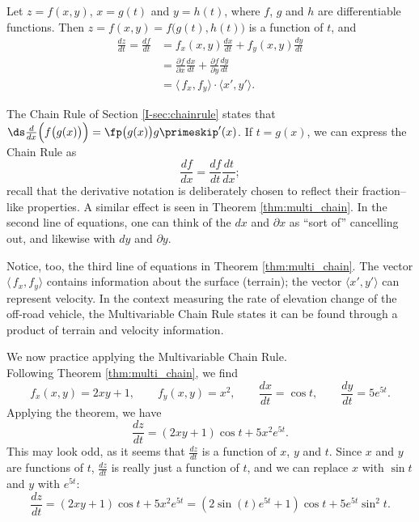 {Let $z=f(x,y)$, $x=g(t)$ and $y=h(t)$, where $f$, $g$ and $h$ are differentiable functions. Then $z = f(x,y) = f\big(g(t),h(t)\big)$ is a function of $t$, and 
\begin{align*}
\frac{dz}{dt} = \frac{df}{dt} &= f_x(x,y)\frac{dx}{dt}+f_y(x,y)\frac{dy}{dt}\\[5pt]
		&= \frac{\partial f}{\partial x}\frac{dx}{dt}+\frac{\partial f}{\partial y}\frac{dy}{dt}\\
		&= \langle\, f_x,f_y\rangle \cdot \langle x',y'\rangle.
\end{align*}
}

The Chain Rule of Section \ref{I-sec:chainrule} states that $\ds \frac{d}{dx}\Big(f\big(g(x)\big)\Big) = \fp\big(g(x)\big)g\primeskip'(x)$. If $t=g(x)$, we can express the Chain Rule as 
\[
\frac{df}{dx} = \frac{df}{dt}\frac{dt}{dx};
\]
recall that the derivative notation is deliberately chosen to reflect their fraction--like properties. A similar effect is seen in Theorem \ref{thm:multi_chain}. In the second line of equations, one can think of the $dx$ and $\partial x$ as ``sort of'' cancelling out, and likewise with $dy$ and $\partial y$. 



Notice, too, the third line of equations in Theorem \ref{thm:multi_chain}. The vector $\langle\,f_x,f_y\rangle$ contains information about the surface (terrain); the vector $\langle x',y'\rangle$ can represent velocity. In the context measuring the rate of elevation change of the off-road vehicle, the Multivariable Chain Rule states it can be found through a product of terrain and velocity information.


We now practice applying the Multivariable Chain Rule.\\

{Following Theorem \ref{thm:multi_chain}, we find
\[
f_x(x,y) = 2xy+1,\qquad f_y(x,y) = x^2,\qquad \frac{dx}{dt} = \cos t,\qquad \frac{dy}{dt}= 5e^{5t}.
\]
Applying the theorem, we have
\[
\frac{dz}{dt} = (2xy+1)\cos t+ 5x^2e^{5t}.
\]
This may look odd, as it seems that $\frac{dz}{dt}$ is a function of $x$, $y$ and $t$. Since $x$ and $y$ are functions of $t$, $\frac{dz}{dt}$ is really just a function of $t$, and we can replace $x$ with $\sin t$ and $y$ with $e^{5t}$:
\[
\frac{dz}{dt} = (2xy+1)\cos t+ 5x^2e^{5t} = (2\sin (t)e^{5t}+1)\cos t+5e^{5t}\sin^2t.
\]
\baselineskip
}\\

